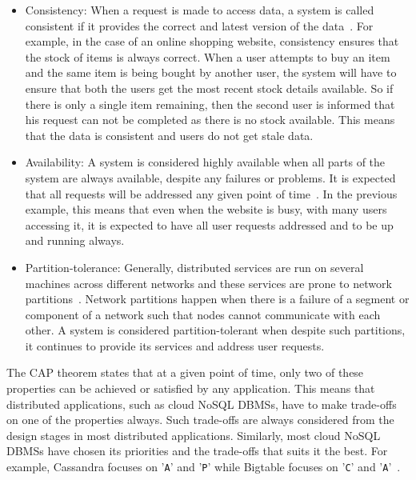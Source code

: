 \begin{itemize}
  
	\item Consistency: When a request is made to access data,   a system is called
	consistent if it provides the correct and latest version of the
	data~\citep{Tai,browne,hp,Ramakrishnan,Wada}.   For example, in the case of an
	online shopping website, consistency ensures that the stock of items is
	always correct.   When a user attempts to buy an item and the same item is being
	bought by another user,   the system will have to ensure that both the users get
	the most recent stock details available.   So if there is only a single item
	remaining,   then the second user is informed that his request can not be
	completed as there is no stock available.  This means that the data is consistent and users
	do not get stale data. 
		
	\item Availability: A system is considered highly available when all parts of
	the system are always available, despite any failures or problems.   It is
	expected that all requests will be addressed any given point of
	time~\citep{Tai,browne,Ramakrishnan,Wada}.   In the previous example,   this
	means that even when the website is busy,   with many users accessing it,   it
	is expected to have all user requests addressed and to be up and running always. 
			
	\item Partition-tolerance: Generally, distributed services are run on several
	machines across different networks and these services are prone to network
	partitions~\citep{Brewer,Gilbert,Ramakrishnan}.  Network partitions happen when
	there is a failure of a segment or component of a network such that nodes cannot
	communicate with each other. 
	A system is considered  partition-tolerant when despite such partitions,   it
	continues to provide its services and address user requests. 
	
\end{itemize}

The CAP theorem states that at a given point of time,   only two of these
properties can be achieved or satisfied by any application.   This means that
distributed applications, such as cloud \ac{NoSQL} \acp{DBMS}, have to make
trade-offs on one of the properties always. Such trade-offs are always
considered from the design stages in most distributed applications. Similarly,
most cloud \ac{NoSQL} \acp{DBMS} have chosen its priorities and the trade-offs
that suits it the best. For example, Cassandra focuses on '\texttt{A}' and
'\texttt{P}' while Bigtable focuses on '\texttt{C}' and
'\texttt{A}'~\citep{bigtable}.

